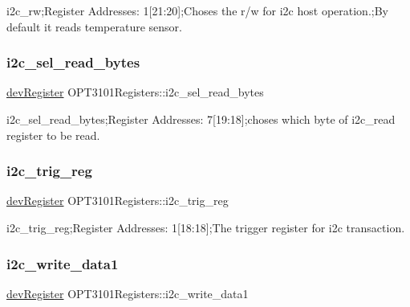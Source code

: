 i2c\+\_\+rw;Register Addresses\+: 1\mbox{[}21\+:20\mbox{]};Choses the r/w for i2c host operation.;By default it reads temperature sensor. 

\mbox{\label{class_o_p_t3101_registers_a77904680d88bd792a64a8647b0b33a3e}} 
\subsubsection{\texorpdfstring{i2c\+\_\+sel\+\_\+read\+\_\+bytes}{i2c\_sel\_read\_bytes}}
{\footnotesize\ttfamily \mbox{\hyperlink{classdev_register}{dev\+Register}} O\+P\+T3101\+Registers\+::i2c\+\_\+sel\+\_\+read\+\_\+bytes}



i2c\+\_\+sel\+\_\+read\+\_\+bytes;Register Addresses\+: 7\mbox{[}19\+:18\mbox{]};choses which byte of i2c\+\_\+read register to be read. 

\mbox{\label{class_o_p_t3101_registers_af75c9e118c738d3f61c4a8300854e119}} 
\subsubsection{\texorpdfstring{i2c\+\_\+trig\+\_\+reg}{i2c\_trig\_reg}}
{\footnotesize\ttfamily \mbox{\hyperlink{classdev_register}{dev\+Register}} O\+P\+T3101\+Registers\+::i2c\+\_\+trig\+\_\+reg}



i2c\+\_\+trig\+\_\+reg;Register Addresses\+: 1\mbox{[}18\+:18\mbox{]};The trigger register for i2c transaction. 

\mbox{\label{class_o_p_t3101_registers_aa1d6fab1063e7f0b1d5a245b1437e35a}} 
\subsubsection{\texorpdfstring{i2c\+\_\+write\+\_\+data1}{i2c\_write\_data1}}
{\footnotesize\ttfamily \mbox{\hyperlink{classdev_register}{dev\+Register}} O\+P\+T3101\+Registers\+::i2c\+\_\+write\+\_\+data1}



